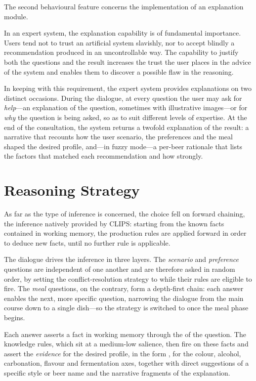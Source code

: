 The second behavioural feature concerns the implementation of an explanation
module.

In an expert system, the explanation capability is of fundamental importance.
Users tend not to trust an artificial system slavishly, nor to accept blindly a
recommendation produced in an uncontrollable way. The capability to justify both
the questions and the result increases the trust the user places in the advice of
the system and enables them to discover a possible flaw in the reasoning.

In keeping with this requirement, the expert system provides explanations on two
distinct occasions. During the dialogue, at every question the user may ask for
\emph{help}---an explanation of the question, sometimes with illustrative
images---or for \emph{why} the question is being asked, so as to suit different
levels of expertise. At the end of the consultation, the system returns a
twofold explanation of the result: a narrative that recounts how the user
scenario, the preferences and the meal shaped the desired profile, and---in fuzzy
mode---a per-beer rationale that lists the factors that matched each
recommendation and how strongly.


\section{Reasoning Strategy}

As far as the type of inference is concerned, the choice fell on forward
chaining, the inference natively provided by CLIPS: starting from the known facts
contained in working memory, the production rules are applied forward in order to
deduce new facts, until no further rule is applicable.

The dialogue drives the inference in three layers. The \emph{scenario} and
\emph{preference} questions are independent of one another and are therefore
asked in random order, by setting the conflict-resolution strategy to
 while their rules are eligible to fire. The \emph{meal} questions,
on the contrary, form a depth-first chain: each answer enables the next, more
specific question, narrowing the dialogue from the main course down to a single
dish---so the strategy is switched to  once the meal phase begins.

Each answer asserts a fact in working memory through the 
of the question. The knowledge rules, which sit at a medium-low salience, then
fire on these facts and assert the \emph{evidence} for the desired profile, in
the form , for the colour, alcohol, carbonation, flavour and fermentation
axes, together with direct suggestions of a specific style or beer name and the
narrative fragments of the explanation.

